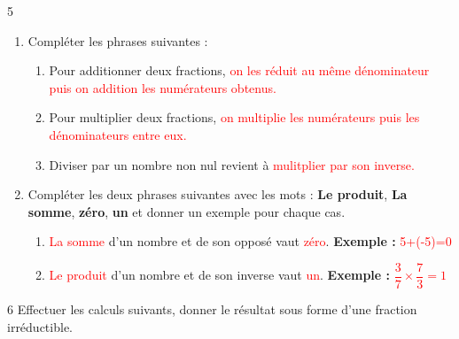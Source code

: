 \documentclass[a4paper]{book}
\begin{document}
{        \begin{exerciceNote}{5}
        \begin{enumerate}
            \item Compléter les phrases suivantes :
    
            \begin{enumerate}
                \item Pour additionner deux fractions, \textcolor{red}{on les réduit au même dénominateur puis on addition les numérateurs obtenus.}
    
                \item Pour multiplier deux fractions,  \textcolor{red}{on multiplie les numérateurs puis les dénominateurs entre eux.}
    
                \item Diviser par un nombre non nul revient à \textcolor{red}{mulitplier par son inverse.}
            \end{enumerate}
    
            \item Compléter les deux phrases suivantes avec les mots : \textbf{Le produit}, \textbf{La somme}, \textbf{zéro}, \textbf{un} et donner un exemple pour chaque cas.

            \begin{enumerate}
                \item \textcolor{red}{La somme} d'un nombre et de son opposé vaut \textcolor{red}{zéro}. \quad \textbf{Exemple : } \textcolor{red}{5+(-5)=0}

                \medskip

                \item \textcolor{red}{Le produit} d'un nombre et de son inverse vaut \textcolor{red}{un}. \quad \textbf{Exemple : } \textcolor{red}{$\dfrac{3}{7}\times\dfrac{7}{3}=1$}
            \end{enumerate}
        \end{enumerate}   
    \end{exerciceNote}


    \begin{exerciceNote}{6}
        Effectuer les calculs suivants, donner le résultat sous forme d'une fraction irréductible.


\end{exerciceNote}}
\end{document}
